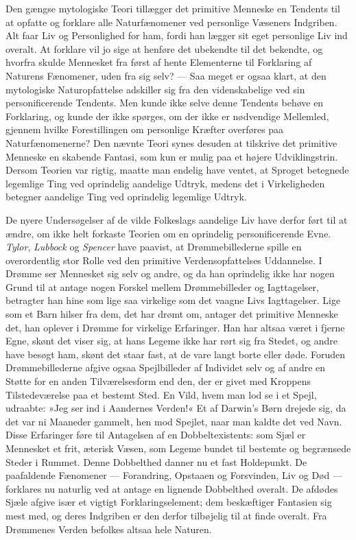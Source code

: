 \documentclass[12pt,a4paper,openany]{book}
\newcommand{\opage}[1]{\marginnote{\footnotesize\textit{[#1]}}}
\begin{document}
Den gængse mytologiske Teori tillægger det primitive Menneske en
Tendents til at opfatte og forklare alle Naturfænomener ved personlige
Væseners Indgriben. Alt faar Liv og Personlighed for ham, fordi han
lægger sit eget personlige Liv ind overalt. At forklare vil jo sige at
henføre det ubekendte til det bekendte, og hvorfra skulde Mennesket fra
først
\opage{8}af hente Elementerne til Forklaring af Naturens Fænomener, uden
fra sig selv? --- Saa meget er ogsaa klart, at den mytologiske
Naturopfattelse adskiller sig fra den videnskabelige ved sin
personificerende Tendents. Men kunde ikke selve denne Tendents behøve en
Forklaring, og kunde der ikke spørges, om der ikke er nødvendige
Mellemled, gjennem hvilke Forestillingen om personlige Kræfter overføres
paa Naturfænomenerne? Den nævnte Teori synes desuden at tilskrive det
primitive Menneske en skabende Fantasi, som kun er mulig paa et højere
Udviklingstrin. Dersom Teorien var rigtig, maatte man endelig have
ventet, at Sproget betegnede legemlige Ting ved oprindelig aandelige
Udtryk, medens det i Virkeligheden betegner aandelige Ting ved
oprindelig legemlige Udtryk.

De nyere Undersøgelser af de vilde Folkeslags aandelige Liv have derfor
ført til at ændre, om ikke helt forkaste Teorien om en oprindelig
personificerende Evne. \emph{Tylor}, \emph{Lubbock} og \emph{Spencer}
have paavist, at Drømmebillederne spille en overordentlig stor Rolle ved
den primitive Verdensopfattelses Uddannelse. I Drømme ser Mennesket sig
selv og andre, og da han oprindelig ikke har nogen Grund til at antage
nogen Forskel mellem Drømmebilleder og Iagttagelser, betragter han hine
som lige saa virkelige som det vaagne Livs Iagttagelser. Lige som et
Barn hilser fra dem, det har drømt om, antager det primitive Menneske
det, han oplever i Drømme for virkelige Erfaringer. Han har altsaa været
i fjerne Egne, skønt det viser sig, at hans Legeme ikke har rørt sig fra
Stedet, og andre have besøgt ham, skønt det staar fast, at de vare langt
borte eller døde. Foruden Drømmebillederne afgive ogsaa Spejlbilleder af
Individet selv og af andre en Støtte for en anden Tilværelsesform end
den, der er givet med Kroppens Tilstedeværelse paa et bestemt Sted. En
Vild, hvem man lod se i et Spejl, udraabte: »Jeg ser ind i Aandernes
Verden!« Et af Darwin’s Børn drejede sig, da det var ni Maaneder
gammelt, hen mod Spejlet, naar man kaldte det ved Navn. Disse Erfaringer
føre til Antagelsen af en Dobbeltexistents: som Sjæl er Mennesket et
frit, æterisk Væsen, som Legeme bundet til bestemte og begrænsede Steder
i Rummet. Denne Dobbelthed danner nu et fast Holdepunkt. De paafaldende
Fænomener --- Forandring, Opstaaen og Forsvinden, Liv og Død ---
forklares nu naturlig
\opage{9}ved at antage en lignende Dobbelthed overalt. De afdødes Sjæle
afgive især et vigtigt Forklaringselement; dem beskæftiger Fantasien sig
mest med, og deres Indgriben er den derfor tilbøjelig til at finde
overalt. Fra Drømmenes Verden befolkes altsaa hele Naturen.
\end{document}
